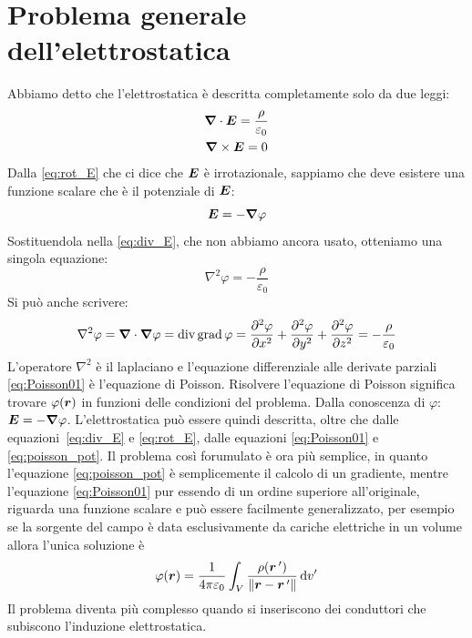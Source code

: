 \chapter{Problema generale dell'elettrostatica}
\minitoc
Abbiamo detto che l'elettrostatica è descritta completamente solo da due leggi:
\begin{subequations}



  \begin{gather}
    \boldsymbol{\nabla}\cdot\boldsymbol{E}=\frac{\rho}{\varepsilon_0}
    \label{eq:div_E}\\
    \boldsymbol{\nabla}\times\boldsymbol{E}=0
    \label{eq:rot_E}
  \end{gather}
\end{subequations}
Dalla \eqref{eq:rot_E} che ci dice che $\boldsymbol{E}$ è irrotazionale, sappiamo che deve esistere una funzione scalare che è il potenziale di $\boldsymbol{E}$:
\begin{equation}
  \boldsymbol{E}=-\boldsymbol{\nabla}\varphi
  \label{eq:poisson_pot}
\end{equation}
Sostituendola nella \eqref{eq:div_E}, che non abbiamo ancora usato, otteniamo una singola equazione:
\begin{equation}
  \nabla^2\varphi=-\frac{\rho}{\varepsilon_0}
  \label{eq:Poisson01}
\end{equation}
Si può anche scrivere:
\[\nabla^2\varphi=\boldsymbol{\nabla}\cdot\boldsymbol{\nabla}\varphi=\operatorname{div}\operatorname{grad}\varphi={\frac{\partial^2 \varphi}{\partial x^2}+\frac{\partial^2 \varphi}{\partial y^2}+\frac{\partial^2 \varphi}{\partial z^2}}=-\frac{\rho}{\varepsilon_0}\]
L'operatore $\nabla^2$ è il laplaciano e l'equazione differenziale alle derivate parziali \eqref{eq:Poisson01} è l'equazione di Poisson. Risolvere l'equazione di Poisson significa trovare $\varphi(\boldsymbol{r})$ in funzioni delle condizioni del problema. Dalla conoscenza di $\varphi$: $\boldsymbol{E}=-\boldsymbol{\nabla}\varphi$. L'elettrostatica può essere quindi descritta, oltre che dalle equazioni~\eqref{eq:div_E} e \eqref{eq:rot_E}, dalle equazioni \eqref{eq:Poisson01} e \eqref{eq:poisson_pot}. Il problema così forumulato è ora più semplice, in quanto l'equazione \eqref{eq:poisson_pot} è semplicemente il calcolo di un gradiente, mentre l'equazione \eqref{eq:Poisson01} pur essendo di un ordine superiore all'originale, riguarda una funzione scalare e può essere facilmente generalizzato, per esempio se la sorgente del campo è data esclusivamente da cariche elettriche in un volume allora l'unica soluzione è
\[\varphi(\boldsymbol{r})=\frac{1}{4\pi\varepsilon_0}\int_V\frac{\rho(\boldsymbol{r}\,')}{\left\lVert\boldsymbol{r}-\boldsymbol{r}\,'\right\rVert}\,\mathrm{d} v'\]
Il problema diventa più complesso quando si inseriscono dei conduttori che subiscono l'induzione elettrostatica.
